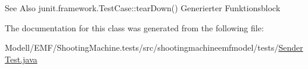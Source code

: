 \begin{DoxySeeAlso}{See Also}
junit.\-framework.\-Test\-Case\-::tear\-Down() Generierter Funktionsblock 
\end{DoxySeeAlso}


The documentation for this class was generated from the following file\-:\begin{DoxyCompactItemize}
\item 
Modell/\-E\-M\-F/\-Shooting\-Machine.\-tests/src/shootingmachineemfmodel/tests/\hyperlink{_sender_test_8java}{Sender\-Test.\-java}\end{DoxyCompactItemize}
